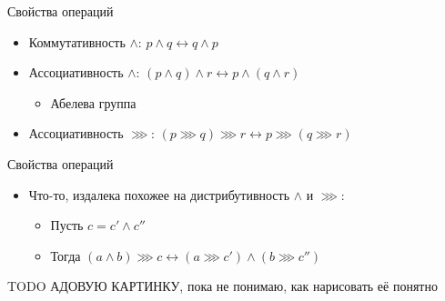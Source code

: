 \begin{frame}{Свойства операций}
  \begin{itemize}
  \item Коммутативность $\wedge$: $p \wedge q \longleftrightarrow q
    \wedge p$
  \item Ассоциативность $\wedge$: $(p \wedge q) \wedge r
    \longleftrightarrow p \wedge (q \wedge r)$
    \begin{itemize}
    \item Абелева группа
    \end{itemize}
  \item Ассоциативность $\ggg$: $(p \ggg q) \ggg r \longleftrightarrow
    p \ggg (q \ggg r)$
  \end{itemize}
\end{frame}

\begin{frame}{Свойства операций}
  \begin{itemize}
  \item Что-то, издалека похожее на дистрибутивность $\wedge$ и $\ggg$:
    \begin{itemize}
    \item Пусть $c = c' \wedge c''$
    \item Тогда $(a \wedge b) \ggg c \longleftrightarrow (a \ggg c')
      \wedge (b \ggg c'') $
    \end{itemize}
  \end{itemize}
  
TODO АДОВУЮ КАРТИНКУ, пока не понимаю, как нарисовать её понятно
\end{frame}